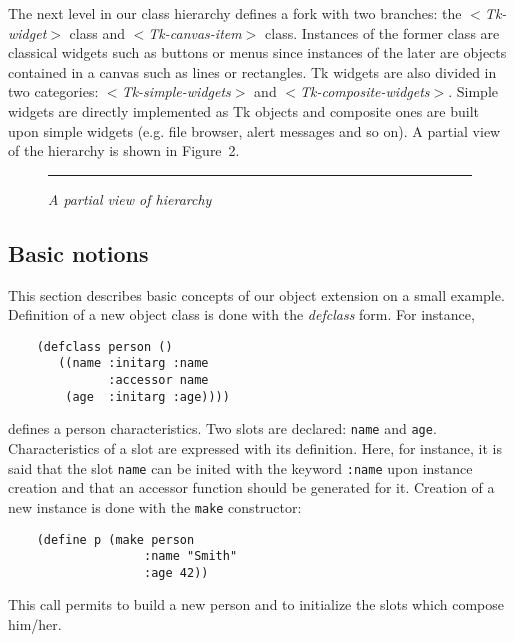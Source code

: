 The next level in our class hierarchy defines a fork with two branches: the
{\em $<$Tk-widget$>$} class and {\em
$<$Tk-canvas-item$>$} class. Instances of the
former class are classical widgets such as buttons or menus since instances of
the later are objects contained in a canvas such as lines or rectangles. Tk
widgets are also divided in two categories: {\em $<$Tk-simple-widgets$>$} and
{\em $<$Tk-composite-widgets$>$}. Simple widgets are directly implemented as
Tk objects and composite ones are built upon simple widgets (e.g. file
browser, alert messages and so on).  A partial view of the
\stk hierarchy is shown in Figure~2.
\begin{figure*}
\centerline{}
\caption{\em A partial view of \stk hierarchy}
\vskip2mm
\hrule
\end{figure*}

\subsection{Basic notions}

This section describes basic concepts of our object extension on a small 
example. Definition of a new object class is done with the {\em defclass} form. 
For instance,
{\small
\begin{verbatim}
    (defclass person ()
       ((name :initarg :name
              :accessor name 
        (age  :initarg :age))))
\end{verbatim}
}
\noindent
defines a person characteristics. Two slots are declared: {\tt name} and 
{\tt age}. Characteristics of a slot are expressed with its definition. 
Here, for instance, it is said that the slot {\tt name} can be inited with 
the keyword {\tt :name} upon instance creation and that an accessor function 
should be generated for it. Creation of a new instance is done with the 
{\tt make} constructor:
{\small
\begin{verbatim}
    (define p (make person 
                   :name "Smith"
                   :age 42))
\end{verbatim}
}
\noindent
This call permits to build a new person and to initialize the slots which
compose him/her.

